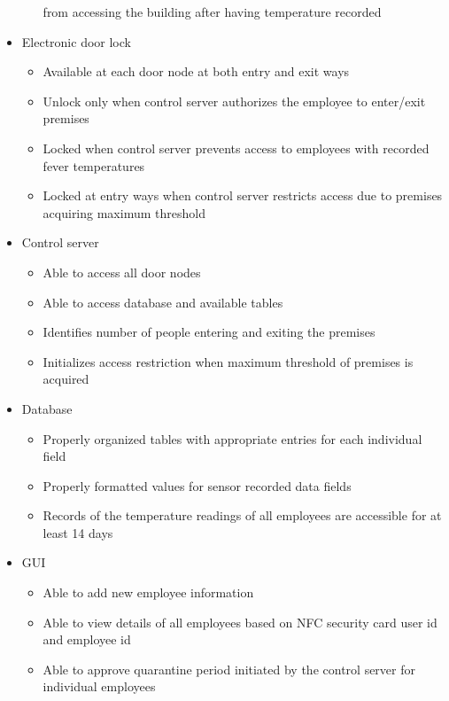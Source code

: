 \begin{itemize}
\begin{itemize}
              from accessing the building after having temperature recorded 
    \end{itemize}
    \item Electronic door lock
    \begin{itemize}
        \item Available at each door node at both entry and exit ways
        \item Unlock only when control server authorizes the employee to
              enter/exit premises
        \item Locked when control server prevents access to employees with
              recorded fever temperatures
        \item Locked at entry ways when control server restricts access due to
              premises acquiring maximum threshold
    \end{itemize}
    \item Control server
    \begin{itemize}
        \item Able to access all door nodes
        \item Able to access database and available tables
        \item Identifies number of people entering and exiting the premises
        \item Initializes access restriction when maximum threshold of premises
              is acquired
    \end{itemize}
    \item Database
    \begin{itemize}
        \item Properly organized tables with appropriate entries for each
              individual field
        \item Properly formatted values for sensor recorded data fields
        \item Records of the temperature readings of all employees are
              accessible for at least 14 days 
    \end{itemize}
    \item GUI
    \begin{itemize}
        \item Able to add new employee information
        \item Able to view details of all employees based on NFC security card
              user id and employee id
        \item Able to approve quarantine period initiated by the control server
              for individual employees
    \end{itemize}
\end{itemize}

